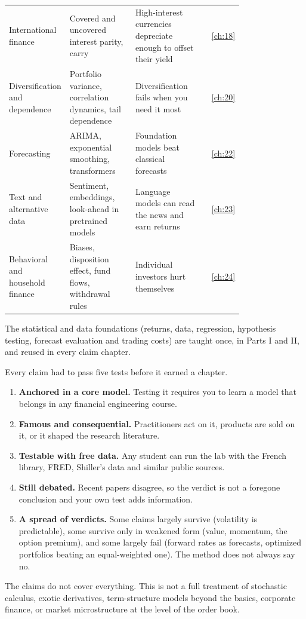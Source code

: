 \begin{longtable}{@{}>{\raggedright\arraybackslash}p{0.198\linewidth}>{\raggedright\arraybackslash}p{0.288\linewidth}>{\raggedright\arraybackslash}p{0.297\linewidth}r@{}}
International finance & Covered and uncovered interest parity, carry & High-interest currencies depreciate enough to offset their yield & \ref{ch:18} \\
Diversification and dependence & Portfolio variance, correlation dynamics, tail dependence & Diversification fails when you need it most & \ref{ch:20} \\
Forecasting & ARIMA, exponential smoothing, transformers & Foundation models beat classical forecasts & \ref{ch:22} \\
Text and alternative data & Sentiment, embeddings, look-ahead in pretrained models & Language models can read the news and earn returns & \ref{ch:23} \\
Behavioral and household finance & Biases, disposition effect, fund flows, withdrawal rules & Individual investors hurt themselves & \ref{ch:24} \\
\end{longtable}
\endgroup

The statistical and data foundations (returns, data, regression, hypothesis testing, forecast evaluation and trading costs) are taught once, in Parts I and II, and reused in every claim chapter.

Every claim had to pass five tests before it earned a chapter.

\begin{enumerate}
  \item \textbf{Anchored in a core model.} Testing it requires you to learn a model that belongs in any financial engineering course.
  \item \textbf{Famous and consequential.} Practitioners act on it, products are sold on it, or it shaped the research literature.
  \item \textbf{Testable with free data.} Any student can run the lab with the French library, FRED, Shiller's data and similar public sources.
  \item \textbf{Still debated.} Recent papers disagree, so the verdict is not a foregone conclusion and your own test adds information.
  \item \textbf{A spread of verdicts.} Some claims largely survive (volatility is predictable), some survive only in weakened form (value, momentum, the option premium), and some largely fail (forward rates as forecasts, optimized portfolios beating an equal-weighted one). The method does not always say no.
\end{enumerate}

The claims do not cover everything. This is not a full treatment of stochastic calculus, exotic derivatives, term-structure models beyond the basics, corporate finance, or market microstructure at the level of the order book. 

